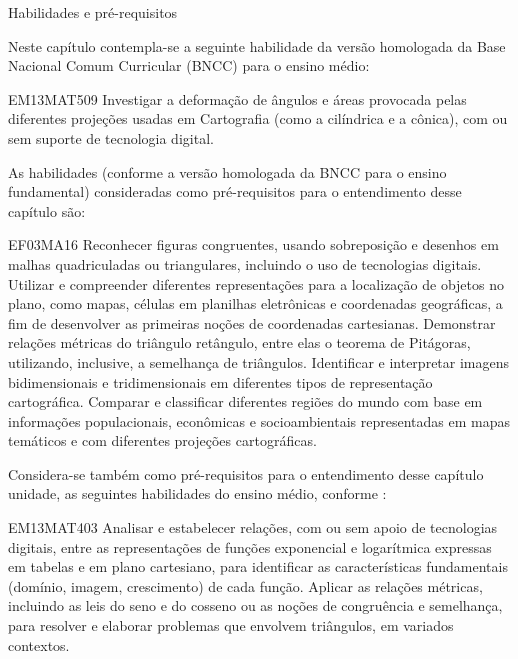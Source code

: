 \mainmatter

\begin{apresentacao}{Habilidades e pré-requisitos}
{

Neste capítulo contempla-se a seguinte habilidade da versão homologada da Base Nacional Comum Curricular (BNCC) \citep{BNCC2018} para o ensino médio:

\begin{habilities}{EM13MAT509}
Investigar a deformação de ângulos e áreas provocada pelas diferentes projeções usadas em Cartografia (como a cilíndrica e a cônica), com ou sem suporte de tecnologia digital.
\end{habilities}

 
As habilidades (conforme a versão homologada da BNCC para o ensino fundamental) consideradas como pré-requisitos para o entendimento desse capítulo são:

\begin{habilities}{EF03MA16}
Reconhecer figuras congruentes, usando sobreposição e desenhos em malhas quadriculadas ou triangulares, incluindo o uso de tecnologias digitais.
 Utilizar e compreender diferentes representações para a localização de objetos no plano, como mapas, células em planilhas eletrônicas e coordenadas geográficas, a fim de desenvolver as primeiras noções de coordenadas cartesianas.
 Demonstrar relações métricas do triângulo retângulo, entre elas o teorema de Pitágoras, utilizando, inclusive, a semelhança de triângulos.
Identificar e interpretar imagens bidimensionais e tridimensionais em diferentes tipos de representação cartográfica.
Comparar e classificar diferentes regiões do mundo com base em informações populacionais, econômicas e socioambientais representadas em mapas temáticos e com diferentes projeções cartográficas.
\end{habilities}


Considera-se também como pré-requisitos para o entendimento desse capítulo unidade, as seguintes habilidades do ensino médio, conforme \cite{BNCC2018}:
\begin{habilities}{EM13MAT403}
Analisar e estabelecer relações, com ou sem apoio de tecnologias digitais, entre as representações de funções exponencial e logarítmica expressas em tabelas e em plano cartesiano, para identificar as características fundamentais (domínio, imagem, crescimento) de cada função.
 Aplicar as relações métricas, incluindo as leis do seno e do cosseno ou as noções de congruência e semelhança, para resolver e elaborar problemas que envolvem triângulos, em variados contextos.
\end{habilities}

}
\end{apresentacao}
